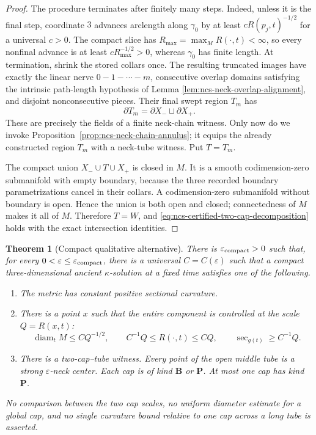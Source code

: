 \documentclass[10pt]{coll-l}
\newtheorem{theorem}{Theorem}[chapter]
\theoremstyle{definition}
\theoremstyle{remark}
\numberwithin{section}{chapter}
\numberwithin{equation}{chapter}
\begin{document}
\begin{proof}
The procedure terminates after finitely many steps.  Indeed, unless it is
the final step, coordinate $3$ advances arclength along $\gamma_0$ by at
least $cR(p_j,t)^{-1/2}$ for a universal $c>0$.  The compact slice has
$R_{\max}=\max_M R(\cdot,t)<\infty$, so every nonfinal advance is at least
$cR_{\max}^{-1/2}>0$, whereas $\gamma_0$ has finite length.  At
termination, shrink the stored collars once.  The resulting truncated
images have exactly the linear nerve $0-1-\cdots-m$, consecutive overlap
domains satisfying the intrinsic path-length hypothesis of Lemma
\ref{lem:ncs-neck-overlap-alignment}, and disjoint nonconsecutive pieces.
Their final swept region $T_m$ has
\begin{equation}
                       \partial T_m=\partial X_-\sqcup\partial X_+.     \label{eq:ncs-constructed-middle-boundary}
\end{equation}
These are precisely the fields of a finite neck-chain witness.  Only now
do we invoke Proposition~\ref{prop:ncs-neck-chain-annulus}; it equips the
already constructed region $T_m$ with a neck-tube witness.  Put $T=T_m$.

The compact union $X_-\cup T\cup X_+$ is closed in $M$.  It is a smooth
codimension-zero submanifold with empty boundary, because the three
recorded boundary parametrizations cancel in their collars.  A
codimension-zero submanifold without boundary is open.  Hence the union is
both open and closed; connectedness of $M$ makes it all of $M$.  Therefore
$T=W$, and \eqref{eq:ncs-certified-two-cap-decomposition} holds with the
exact intersection identities.
\end{proof}

\begin{theorem}[Compact qualitative alternative]
\label{thm:ncs-compact-alternative}
There is $\varepsilon_{\rm compact}>0$ such that, for every
$0<\varepsilon\leq\varepsilon_{\rm compact}$, there is a universal
$C=C(\varepsilon)$ such that a compact three-dimensional ancient
$\kappa$-solution at a fixed time satisfies one of the following.
\begin{enumerate}
\item The metric has constant positive sectional curvature.
\item There is a point $x$ such that the entire component is controlled at
      the scale $Q=R(x,t)$:
      \begin{equation}
       \operatorname{diam}_tM\leq C Q^{-1/2},\qquad
      C^{-1}Q\leq R(\cdot,t)\leq CQ,\qquad
       \sec_{g(t)}\geq C^{-1}Q.                        \label{eq:ncs-compact-controlled}
      \end{equation}
\item There is a two-cap--tube witness.  Every point of the open middle
      tube is a strong $\varepsilon$-neck center.  Each cap is of kind
      $\mathbf B$ or $\mathbf P$.  At most one cap has kind $\mathbf P$.
\end{enumerate}
No comparison between the two cap scales, no uniform diameter estimate for
a global cap, and no single curvature bound relative to one cap across a
long tube is asserted.
\end{theorem}
\end{document}
